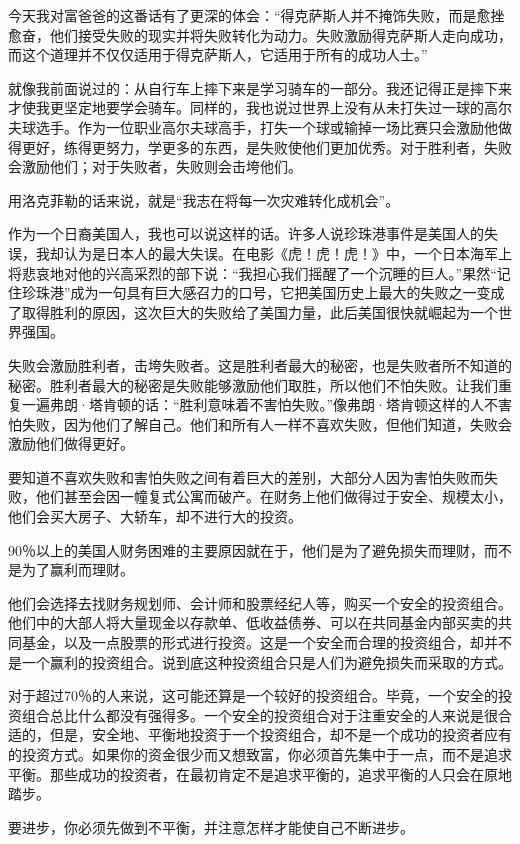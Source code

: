 今天我对富爸爸的这番话有了更深的体会：“得克萨斯人并不掩饰失败，而是愈挫愈奋，他们接受失败的现实并将失败转化为动力。失败激励得克萨斯人走向成功，而这个道理并不仅仅适用于得克萨斯人，它适用于所有的成功人士。”

就像我前面说过的：从自行车上摔下来是学习骑车的一部分。我还记得正是摔下来才使我更坚定地要学会骑车。同样的，我也说过世界上没有从未打失过一球的高尔夫球选手。作为一位职业高尔夫球高手，打失一个球或输掉一场比赛只会激励他做得更好，练得更努力，学更多的东西，是失败使他们更加优秀。对于胜利者，失败会激励他们；对于失败者，失败则会击垮他们。

用洛克菲勒的话来说，就是“我志在将每一次灾难转化成机会”。

作为一个日裔美国人，我也可以说这样的话。许多人说珍珠港事件是美国人的失误，我却认为是日本人的最大失误。在电影《虎！虎！虎！》中，一个日本海军上将悲哀地对他的兴高采烈的部下说：“我担心我们摇醒了一个沉睡的巨人。”果然“记住珍珠港”成为一句具有巨大感召力的口号，它把美国历史上最大的失败之一变成了取得胜利的原因，这次巨大的失败给了美国力量，此后美国很快就崛起为一个世界强国。

失败会激励胜利者，击垮失败者。这是胜利者最大的秘密，也是失败者所不知道的秘密。胜利者最大的秘密是失败能够激励他们取胜，所以他们不怕失败。让我们重复一遍弗朗·塔肯顿的话：“胜利意味着不害怕失败。”像弗朗·塔肯顿这样的人不害怕失败，因为他们了解自己。他们和所有人一样不喜欢失败，但他们知道，失败会激励他们做得更好。

要知道不喜欢失败和害怕失败之间有着巨大的差别，大部分人因为害怕失败而失败，他们甚至会因一幢复式公寓而破产。在财务上他们做得过于安全、规模太小，他们会买大房子、大轿车，却不进行大的投资。

90％以上的美国人财务困难的主要原因就在于，他们是为了避免损失而理财，而不是为了赢利而理财。

他们会选择去找财务规划师、会计师和股票经纪人等，购买一个安全的投资组合。他们中的大部人将大量现金以存款单、低收益债券、可以在共同基金内部买卖的共同基金，以及一点股票的形式进行投资。这是一个安全而合理的投资组合，却并不是一个赢利的投资组合。说到底这种投资组合只是人们为避免损失而采取的方式。

对于超过70％的人来说，这可能还算是一个较好的投资组合。毕竟，一个安全的投资组合总比什么都没有强得多。一个安全的投资组合对于注重安全的人来说是很合适的，但是，安全地、平衡地投资于一个投资组合，却不是一个成功的投资者应有的投资方式。如果你的资金很少而又想致富，你必须首先集中于一点，而不是追求平衡。那些成功的投资者，在最初肯定不是追求平衡的，追求平衡的人只会在原地踏步。

要进步，你必须先做到不平衡，并注意怎样才能使自己不断进步。

